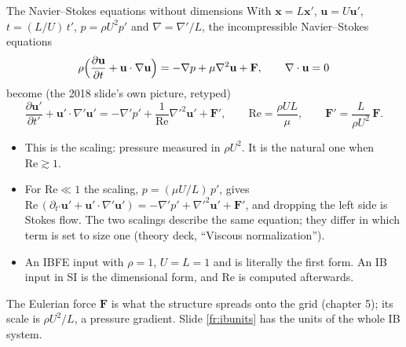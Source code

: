 \documentclass[aspectratio=169,11pt]{beamer}
\begin{document}
\begin{frame}{The Navier--Stokes equations without dimensions}
\label{fr:ns}
\small With $\mathbf{x} = L\mathbf{x}'$, $\mathbf{u} = U\mathbf{u}'$, $t = (L/U)\,t'$, $p = \rho U^2 p'$ and $\nabla = \nabla'/L$, the incompressible Navier--Stokes equations
\[
  \rho\Bigl(\frac{\partial\mathbf{u}}{\partial t} + \mathbf{u}\cdot\nabla\mathbf{u}\Bigr) = -\nabla p + \mu\nabla^2\mathbf{u} + \mathbf{F}, \qquad \nabla\cdot\mathbf{u} = 0
\]
become (the 2018 slide's own picture, retyped)
\[
  \frac{\partial\mathbf{u}'}{\partial t'} + \mathbf{u}'\cdot\nabla'\mathbf{u}' = -\nabla' p' + \frac{1}{\mathrm{Re}}\nabla'^2\mathbf{u}' + \mathbf{F}', \qquad \mathrm{Re} = \frac{\rho U L}{\mu}, \qquad \mathbf{F}' = \frac{L}{\rho U^2}\,\mathbf{F}.
\]
\begin{itemize}
  \item This is the  scaling: pressure measured in $\rho U^2$. It is the natural one when $\mathrm{Re} \gtrsim 1$.
  \item For $\mathrm{Re} \ll 1$ the  scaling, $p = (\mu U/L)\,p'$, gives $\mathrm{Re}\,(\partial_{t'}\mathbf{u}' + \mathbf{u}'\cdot\nabla'\mathbf{u}') = -\nabla'p' + \nabla'^2\mathbf{u}' + \mathbf{F}'$, and dropping the left side is Stokes flow. The two scalings describe the same equation; they differ in which term is set to size one (theory deck, ``Viscous normalization'').
  \item An IBFE input with $\rho = 1$, $U = L = 1$ and  is literally the first form. An IB input in SI is the dimensional form, and $\mathrm{Re}$ is computed afterwards.
\end{itemize}
\small The Eulerian force $\mathbf{F}$ is what the structure spreads onto the grid (chapter 5); its scale is $\rho U^2/L$, a pressure gradient. Slide \ref{fr:ibunits} has the units of the whole IB system.
\end{frame}
\end{document}
